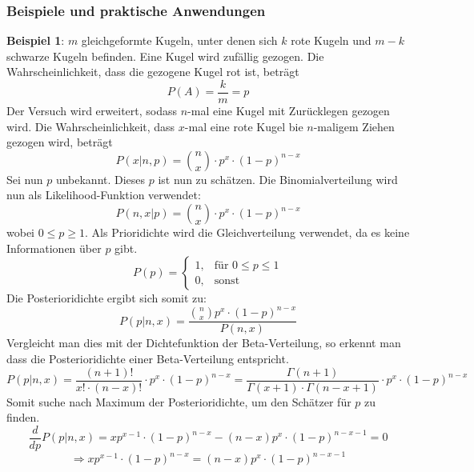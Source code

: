 \documentclass[a4paper,12pt]{article}
\begin{document}
\subsubsection{Beispiele und praktische Anwendungen}
\textbf{Beispiel 1}: $m$ gleichgeformte Kugeln, unter denen sich $k$ rote Kugeln und $m-k$ schwarze Kugeln befinden. Eine Kugel wird zufällig gezogen. 
Die Wahrscheinlichkeit, dass die gezogene Kugel rot ist, beträgt 
\begin{equation}
P(A) = \frac{k}{m} = p
\end{equation}
Der Versuch wird erweitert, sodass $n$-mal eine Kugel mit Zurücklegen gezogen wird.
Die Wahrscheinlichkeit, dass $x$-mal eine rote Kugel bie $n$-maligem Ziehen gezogen wird,
beträgt
\begin{equation}
P(x|n,p) = \binom{n}{x} \cdot p^x \cdot (1-p)^{n-x}
\end{equation}
Sei nun $p$ unbekannt. Dieses $p$ ist nun zu schätzen.
Die Binomialverteilung wird nun als Likelihood-Funktion verwendet:
\begin{equation}
P(n,x|p) = \binom{n}{x} \cdot p^x \cdot (1-p)^{n-x}
\end{equation}
wobei $0 \leq p \geq 1$.
Als Prioridichte wird die Gleichverteilung verwendet, da es keine Informationen über $p$ gibt.
\begin{equation}
  P(p) =
  \begin{cases}
    1, & \text{für } 0 \leq p \leq 1 \\
    0, & \text{sonst}
  \end{cases}
\end{equation}
Die Posterioridichte ergibt sich somit zu:
\begin{equation}
P(p|n,x) = \frac{\binom{n}{x}  p^x \cdot (1-p)^{n-x}}{P(n,x)}
\label{eq:posterior}
\end{equation}
Vergleicht man dies mit der Dichtefunktion der Beta-Verteilung, so erkennt man dass die Posterioridichte einer Beta-Verteilung entspricht.
\begin{equation}
P(p|n,x) = \frac{(n+1)!}{x!\cdot(n-x)!} \cdot p^x \cdot (1-p)^{n-x}
= \frac{\Gamma(n+1)}{\Gamma(x+1)\cdot\Gamma(n-x+1)} \cdot p^x \cdot (1-p)^{n-x}
\end{equation}
Somit suche nach Maximum der Posterioridichte, um den Schätzer für $p$ zu finden.
\begin{equation}
\frac{d}{dp} P(p|n,x) = xp^{x-1} \cdot (1-p)^{n-x} - (n-x)p^x \cdot (1-p)^{n-x-1} = 0
\end{equation}
\begin{equation}
\Rightarrow xp^{x-1} \cdot (1-p)^{n-x} = (n-x)p^x \cdot (1-p)^{n-x-1}
\end{equation}
\end{document}
